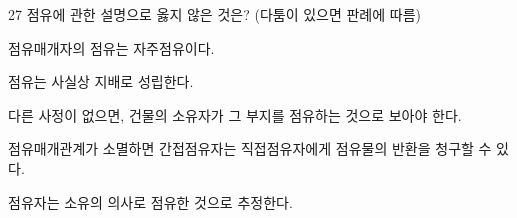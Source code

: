 \begin{question}{27}
점유에 관한 설명으로 옳지 않은 것은? (다툼이 있으면 판례에 따름)
\begin{choices}
  \item 점유매개자의 점유는 자주점유이다.
  \item 점유는 사실상 지배로 성립한다.
  \item 다른 사정이 없으면, 건물의 소유자가 그 부지를 점유하는 것으로 보아야 한다.
  \item 점유매개관계가 소멸하면 간접점유자는 직접점유자에게 점유물의 반환을 청구할 수 있다.
  \item 점유자는 소유의 의사로 점유한 것으로 추정한다.
\end{choices}
\end{question}
